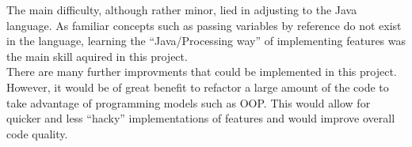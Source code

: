 \documentclass[titlepage]{scrartcl}
\begin{document}
    The main difficulty, although rather minor, lied in adjusting to the Java
    language. As familiar concepts such as passing variables by reference do
    not exist in the language, learning the ``Java/Processing way'' of
    implementing features was the main skill aquired in this project.\\

    There are many further improvments that could be implemented in this
    project. However, it would be of great benefit to refactor a large amount
    of the code to take advantage of programming models such as OOP. This would
    allow for quicker and less ``hacky'' implementations of features and would
    improve overall code quality.
    \printbibliography
\end{document}
